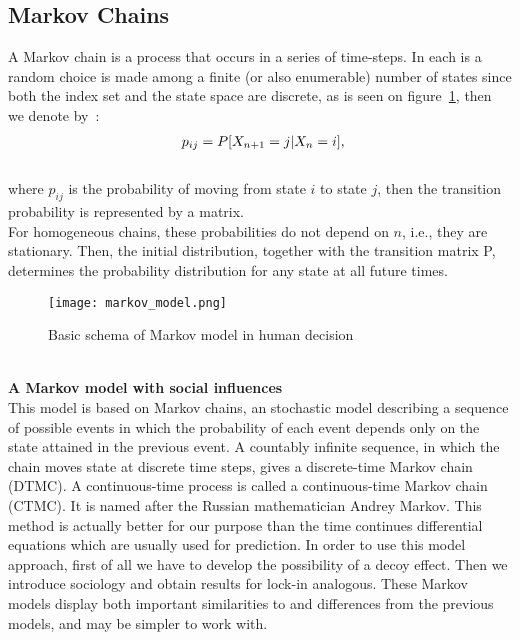 \subsection{Markov Chains} \label{subsec:chain}
A Markov chain is a process that occurs in a series of time-steps.
In each is a random choice is made among a finite (or also enumerable) number of states since both  the index set and
the state space are discrete, as is seen on figure~\ref{markovmodel}, then we denote by~\cite{patel}:\\
\begin{equation} \label{eq:6}
\begin{array}{l@{}l}
	p_{ij}=P[X_{n+1}=j|X_n=i],
\end{array}
\end{equation}\\
where $p_{ij}$ is the probability of moving from state $i$ to state $j$, then the transition probability is represented by a matrix.\\
For homogeneous chains, these probabilities do not depend on $n$, i.e., they are stationary.
Then, the initial distribution, together with the transition matrix P, determines the probability distribution for any state at all future times.\\
\begin{figure}[h!]
	\begin{center}
		\texttt{[image: markov\_model.png]}
	\end{center}
	\caption{Basic schema of Markov model in human decision~\cite{patel}}
	\label{markovmodel}
\end{figure}
\\
\textbf{A Markov model with social influences} \label{subsec:markov}\\
This model is based on Markov chains, an stochastic model describing a sequence of possible events in which the probability
of each event depends only on the state attained in the previous event. A countably infinite sequence, in which the chain moves
state at discrete time steps, gives a discrete-time Markov chain (DTMC).
A continuous-time process is called a continuous-time Markov chain (CTMC).
It is named after the Russian mathematician Andrey Markov.
This method is actually better for our purpose than the time continues differential equations which are usually used for prediction.
In order to use this model approach, first of all we have to develop the possibility of a decoy effect.
Then we introduce sociology and obtain results for lock-in analogous.
These Markov models display both important similarities to and differences from the previous models, and may be simpler to work with.
